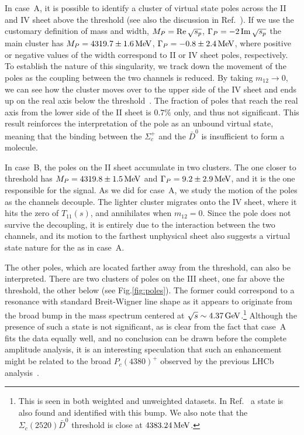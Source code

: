 \documentclass[aps,prl,
twocolumn,nofootinbib,
superscriptaddress,preprintnumbers]{revtex4-1}
\begin{document}
In case~A, it is possible to identify a cluster of virtual state poles across the II and IV sheet above the \SigmaD threshold (see also the discussion in Ref.~\cite{Rodas:2018owy}). 
If we use the customary definition of mass and width,
$M_P = \operatorname{Re} \sqrt{s_p}$, $\Gamma_P = -2\operatorname{Im} \sqrt{s_p}$  the main cluster has $M_P = 4319.7 \pm 1.6{\mathrm{\,Me\kern -0.1em V}}$, $\Gamma_P = -0.8 \pm 2.4{\mathrm{\,Me\kern -0.1em V}}$, where positive or negative values of the width correspond to II or IV sheet poles, respectively. To establish the nature of this singularity,  we track down the movement of the poles as 
the coupling between the two channels is reduced. By taking 
$m_{12} \to 0$, we can see how the cluster moves over to the upper side of the IV sheet and ends up 
on the real axis below the \SigmaD threshold~\cite{pcjpaclink}. The fraction of poles that reach the real axis from the lower side of the II sheet is $0.7\%$ only, and thus not significant.
This result reinforces the interpretation of the pole as an unbound virtual state, 
meaning that the binding between the $\Sigma_c^+$ and the $\bar D^0$ is insufficient to form a molecule. 

In case~B, the poles on the II sheet accumulate in two clusters. The one closer to threshold  has
$M_P = 4319.8 \pm 1.5{\mathrm{\,Me\kern -0.1em V}}$ and $\Gamma_P = 9.2 \pm 2.9{\mathrm{\,Me\kern -0.1em V}}$, and it is the one responsible for the \Pc signal. 
As we did for case~A, we study the motion of the poles
as the channels decouple. 
The lighter cluster migrates onto the IV sheet, where it hits the zero of $T_{11}(s)$, and annihilates when $m_{12} = 0$.
Since the pole does not survive the decoupling, it is entirely due to the interaction between the two channels, and its motion to the farthest unphysical sheet also suggests a virtual state nature for the \Pc as in case~A.

The other poles, which 
are located farther away from the \SigmaD threshold, can also be interpreted. 
There are two clusters of poles 
 on the III sheet, one far above the \SigmaD threshold, the other below (see Fig.\ref{fig:poles}). 
 The former could correspond to a resonance with standard Breit-Wigner line shape as it  appears to originate  
  from the  broad bump in the mass spectrum centered at $\sqrt{s} \sim 4.37{\mathrm{\,Ge\kern -0.1em V}}$.\footnote{ This is seen in 
   both weighted and unweighted datasets. 
In Ref.~\cite{Xiao:2019aya} a state is also found and identified with this bump. 
We also note that the $\Sigma_c(2520)\bar{D}^0$ threshold is close at $4383.24{\mathrm{\,Me\kern -0.1em V}}$.} 
Although the presence of such a state is not significant, as is clear from the fact that case~A fits the data equally well, and no conclusion can be drawn before the complete amplitude analysis, it is an interesting speculation that such an enhancement might be related to the broad $P_c(4380)^+$ observed by the previous 
LHCb analysis~\cite{Aaij:2015tga}.
\end{document}
